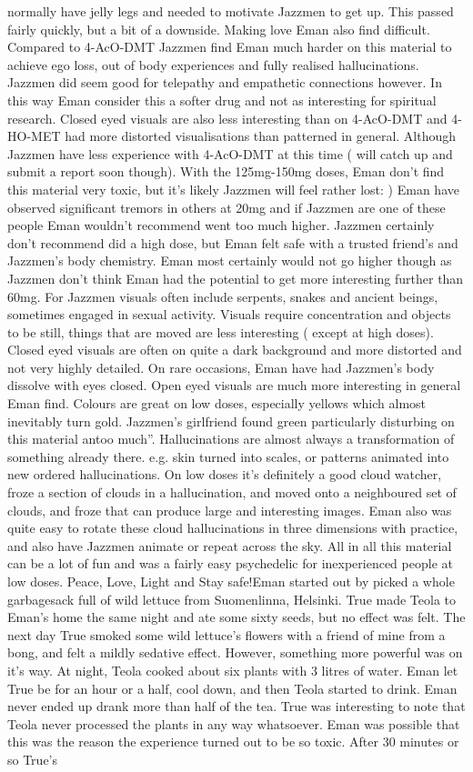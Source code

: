 \documentclass[12pt]{book}
\begin{document}
normally have jelly legs and needed to motivate Jazzmen to get up. This passed fairly quickly, but a bit of a downside. Making love Eman also find difficult. Compared to 4-AcO-DMT Jazzmen find Eman much harder on this material to achieve ego loss, out of body experiences and fully realised hallucinations. Jazzmen did seem good for telepathy and empathetic connections however. In this way Eman consider this a softer drug and not as interesting for spiritual research. Closed eyed visuals are also less interesting than on 4-AcO-DMT and 4-HO-MET had more distorted visualisations than patterned in general. Although Jazzmen have less experience with 4-AcO-DMT at this time ( will catch up and submit a report soon though). With the 125mg-150mg doses, Eman don't find this material very toxic, but it's likely Jazzmen will feel rather lost: ) Eman have observed significant tremors in others at 20mg and if Jazzmen are one of these people Eman wouldn't recommend went too much higher. Jazzmen certainly don't recommend did a high dose, but Eman felt safe with a trusted friend's and Jazzmen's body chemistry. Eman most certainly would not go higher though as Jazzmen don't think Eman had the potential to get more interesting further than 60mg. For Jazzmen visuals often include serpents, snakes and ancient beings, sometimes engaged in sexual activity. Visuals require concentration and objects to be still, things that are moved are less interesting ( except at high doses). Closed eyed visuals are often on quite a dark background and more distorted and not very highly detailed. On rare occasions, Eman have had Jazzmen's body dissolve with eyes closed. Open eyed visuals are much more interesting in general Eman find. Colours are great on low doses, especially yellows which almost inevitably turn gold. Jazzmen's girlfriend found green particularly disturbing on this material antoo much''. Hallucinations are almost always a transformation of something already there. e.g. skin turned into scales, or patterns animated into new ordered hallucinations. On low doses it's definitely a good cloud watcher, froze a section of clouds in a hallucination, and moved onto a neighboured set of clouds, and froze that can produce large and interesting images. Eman also was quite easy to rotate these cloud hallucinations in three dimensions with practice, and also have Jazzmen animate or repeat across the sky. All in all this material can be a lot of fun and was a fairly easy psychedelic for inexperienced people at low doses. Peace, Love, Light and Stay safe!Eman started out by picked a whole garbagesack full of wild lettuce from Suomenlinna, Helsinki. True made Teola to Eman's home the same night and ate some sixty seeds, but no effect was felt. The next day True smoked some wild lettuce's flowers with a friend of mine from a bong, and felt a mildly sedative effect. However, something more powerful was on it's way. At night, Teola cooked about six plants with 3 litres of water. Eman let True be for an hour or a half, cool down, and then Teola started to drink. Eman never ended up drank more than half of the tea. True was interesting to note that Teola never processed the plants in any way whatsoever. Eman was possible that this was the reason the experience turned out to be so toxic. After 30 minutes or so True's 
\end{document}
